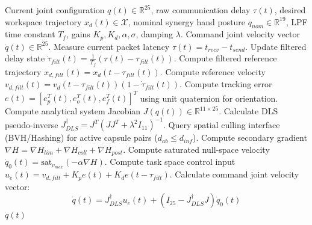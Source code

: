 \documentclass[letterpaper,journal]{IEEEtran}
\begin{document}
\begin{algorithm}[H]
\caption{Singularity-Robust and Delay-Robust Unified CLIK Control}
\label{alg:clik}
\begin{algorithmic}[1]
\REQUIRE Current joint configuration $q(t) \in \mathbb{R}^{25}$, raw communication delay $\tau(t)$, desired workspace trajectory $x_d(t) \in \mathcal{X}$, nominal synergy hand posture $q_{nom} \in \mathbb{R}^{19}$, LPF time constant $T_f$, gains $K_p, K_d, \alpha, \sigma$, damping $\lambda$.
\ENSURE Command joint velocity vector $\dot{q}(t) \in \mathbb{R}^{25}$.
\STATE Measure current packet latency $\tau(t) = t_{recv} - t_{send}$.
\STATE Update filtered delay state $\dot{\tau}_{filt}(t) = \frac{1}{T_f} (\tau(t) - \tau_{filt}(t))$.
\STATE Compute filtered reference trajectory $x_{d,filt}(t) = x_d(t - \tau_{filt}(t))$.
\STATE Compute reference velocity $v_{d,filt}(t) = v_d(t - \tau_{filt}(t))(1 - \dot{\tau}_{filt}(t))$.
\STATE Compute tracking error $e(t) = [e_p^T(t), e_o^T(t), e_f^T(t)]^T$ using unit quaternion for orientation.
\STATE Compute analytical system Jacobian $J(q(t)) \in \mathbb{R}^{11 \times 25}$.
\STATE Calculate DLS pseudo-inverse $J^{\dagger}_{DLS} = J^T\left(J J^T + \lambda^2 I_{11}\right)^{-1}$.
\STATE Query spatial culling interface (BVH/Hashing) for active capsule pairs ($d_{ab} \le d_{inf}$).
\STATE Compute secondary gradient $\nabla H = \nabla H_{lim} + \nabla H_{coll} + \nabla H_{post}$.
\STATE Compute saturated null-space velocity $\dot{q}_0(t) = \text{sat}_{v_{max}} \left( -\alpha \nabla H \right)$.
\STATE Compute task space control input $u_e(t) = v_{d,filt} + K_p e(t) + K_d e(t - \tau_{filt})$.
\STATE Calculate command joint velocity vector:
$$\dot{q}(t) = J^{\dagger}_{DLS} u_e(t) + \left( I_{25} - J^{\dagger}_{DLS} J \right) \dot{q}_0(t)$$
\RETURN $\dot{q}(t)$
\end{algorithmic}
\end{algorithm}
\end{document}
